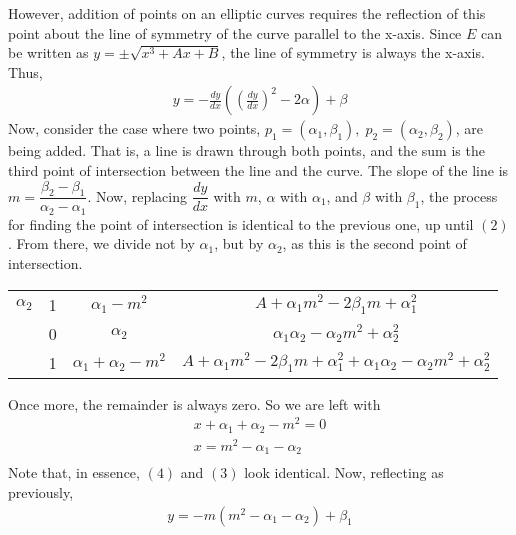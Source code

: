 \documentclass[12pt,letterpaper]{article}
\begin{document}
However, addition of points on an elliptic curves requires the reflection of this point about the line of symmetry of the curve parallel to the x-axis. Since $E$ can be written as $y=\pm\sqrt{x^3+Ax+B}$, the line of symmetry is always the x-axis. Thus,
\begin{align*}
y=-\frac{dy}{dx}\left(\left(\frac{dy}{dx}\right)^2-2\alpha\right)+\beta
\end{align*}
\break
Now, consider the case where two points, $p_1=(\alpha_1,\beta_1),\; p_2=(\alpha_2,\beta_2)$, are being added. That is, a line is drawn through both points, and the sum is the third point of intersection between the line and the curve.
The slope of the line is $m=\dfrac{\beta_2-\beta_1}{\alpha_2-\alpha_1}$. Now, replacing $\dfrac{dy}{dx}$ with $m$, $\alpha$ with $\alpha_1$, and $\beta$ with $\beta_1$, the process for finding the point of intersection is identical to the previous one, up until $(2)$. From there, we divide not by $\alpha_1$, but by $\alpha_2$, as this is the second point of intersection.
\begin{center}
  \begin{tabular} { c | c | c | c }
  $\alpha_2$ & 1 & $\alpha_1-m^2$ & $A+\alpha_1 m^2-2\beta_1 m+\alpha_1^2$ \\ 
  & 0 & $\alpha_2$ & $\alpha_1\alpha_2-\alpha_2 m^2+\alpha_2^2$ \\
  \hline
  & 1 & $\alpha_1+\alpha_2-m^2$ & $A+\alpha_1 m^2-2\beta_1 m + \alpha_1^2+\alpha_1\alpha_2-\alpha_2 m^2+\alpha_2^2$ \\
  \end{tabular}
  \break
\end{center}
Once more, the remainder is always zero. So we are left with
\begin{align*}
x+\alpha_1 + \alpha_2 -m^2=0 \\
x=m^2-\alpha_1 - \alpha_2 \tag{4}\\ 
\end{align*}
Note that, in essence, $(4)$ and $(3)$ look identical.
Now, reflecting as previously,
\begin{align*}
y=-m(m^2-\alpha_1-\alpha_2)+\beta_1
\end{align*}
\end{document}
